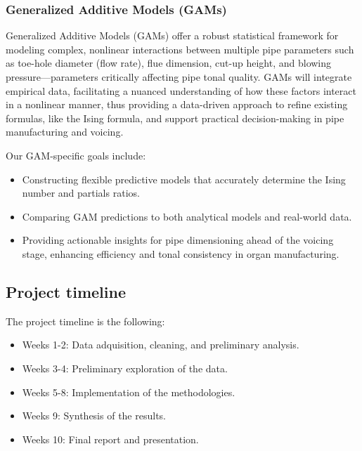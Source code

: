 \documentclass{psu-plan}
\begin{document}

\subsubsection{Generalized Additive Models (GAMs)}
Generalized Additive Models (GAMs) offer a robust statistical framework for modeling complex, 
nonlinear interactions between multiple pipe parameters such as toe-hole diameter (flow rate), flue dimension,
cut-up height, and blowing pressure—parameters critically affecting pipe tonal quality. 
GAMs will integrate empirical data, facilitating a nuanced understanding of how these factors interact in a nonlinear 
manner, thus providing a data-driven approach to refine existing formulas, like the Ising formula, and support 
practical decision-making in pipe manufacturing and voicing.

Our GAM-specific goals include:
\begin{itemize}
    \item Constructing flexible predictive models that accurately determine the Ising number and partials ratios.
    \item Comparing GAM predictions to both analytical models and real-world data.
    \item Providing actionable insights for pipe dimensioning ahead of the voicing stage, enhancing efficiency 
    and tonal consistency in organ manufacturing.
\end{itemize}

\subsection{Project timeline}

The project timeline is the following:
\begin{itemize}
    \item Weeks 1-2: Data adquisition, cleaning, and preliminary analysis.
    \item Weeks 3-4: Preliminary exploration of the data.
    \item Weeks 5-8: Implementation of the methodologies.
    \item Weeks 9: Synthesis of the results.
    \item Weeks 10: Final report and presentation.
\end{itemize}

\nocite{*} %
\printbibliography[heading=bibintoc,title=Bibliography]
\end{document}
